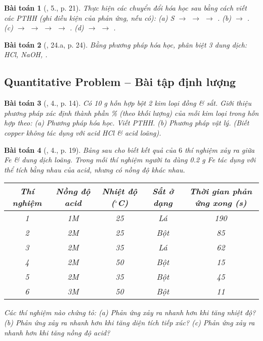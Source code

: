 \documentclass{article}
\newtheorem{baitoan}{Bài toán}
\begin{document}
\begin{baitoan}[\cite{SGK_Hoa_Hoc_9}, 5., p. 21]
	Thực hiện các chuyển đổi hóa học sau bằng cách viết các PTHH (ghi điều kiện của phản ứng, nếu có): (a) \emph{S $\to$  $\to$  $\to$ }. (b) \emph{ $\to$ }. (c) \emph{ $\to$  $\to$  $\to$  $\to$ }. (d) \emph{ $\to$  $\to$ }.
\end{baitoan}

\begin{baitoan}[\cite{An_350_BT_Hoa_Hoc_9}, 24.a, p. 24]
	Bằng phương pháp hóa học, phân biệt 3 dung dịch: \emph{HCl, NaOH, }.
\end{baitoan}

\subsection{Quantitative Problem -- Bài tập định lượng}

\begin{baitoan}[\cite{SGK_Hoa_Hoc_9}, 4., p. 14]
	Có \emph{10 g} hỗn hợp bột 2 kim loại đồng \& sắt. Giới thiệu phương pháp xác định thành phần \% (theo khối lượng) của mỗi kim loại trong hỗn hợp theo: (a) Phương pháp hóa học. Viết PTHH. (b) Phương pháp vật lý. (Biết copper không tác dụng với acid \emph{HCl} \& acid \emph{} loãng).
\end{baitoan}

\begin{baitoan}[\cite{SGK_Hoa_Hoc_9}, 4., p. 19]
	Bảng sau cho biết kết quả của $6$ thí nghiệm xảy ra giữa \emph{Fe} \& dung dịch \emph{} loãng. Trong mỗi thí nghiệm người ta dùng \emph{0.2 g Fe} tác dụng với thể tích bằng nhau của acid, nhưng có nồng độ khác nhau.
	\begin{table}[H]
		\centering
		\begin{tabular}{|c|c|c|c|c|}
			\hline
			Thí nghiệm & Nồng độ acid & Nhiệt độ (${}^\circ$C) & Sắt ở dạng & Thời gian phản ứng xong (s) \\
			\hline
			1 & 1M & 25 & Lá & 190 \\
			\hline
			2 & 2M & 25 & Bột & 85 \\
			\hline
			3 & 2M & 35 & Lá & 62 \\
			\hline
			4 & 2M & 50 & Bột & 15 \\
			\hline
			5 & 2M & 35 & Bột & 45 \\
			\hline
			6 & 3M & 50 & Bột & 11 \\
			\hline
		\end{tabular}
	\end{table}
	\noindent Các thí nghiệm nào chứng tỏ: (a) Phản ứng xảy ra nhanh hơn khi tăng nhiệt độ? (b) Phản ứng xảy ra nhanh hơn khi tăng diện tích tiếp xúc? (c) Phản ứng xảy ra nhanh hơn khi tăng nồng độ acid?
\end{baitoan}
\end{document}
